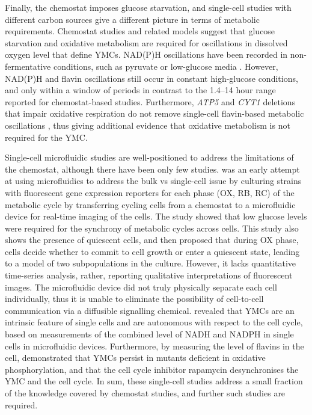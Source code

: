 Finally, the chemostat imposes glucose starvation, and single-cell studies with different carbon sources give a different picture in terms of metabolic requirements.
Chemostat studies and related models suggest that glucose starvation and oxidative metabolism are required for oscillations in dissolved oxygen level that define YMCs.
NAD(P)H oscillations have been recorded in non-fermentative conditions, such as pyruvate or low-glucose media \citep{papagiannakisAutonomousMetabolicOscillations2017}.
However, NAD(P)H \citep{papagiannakisAutonomousMetabolicOscillations2017,ozsezenInferenceHighLevelInteraction2019} and flavin \citep{baumgartnerFlavinbasedMetabolicCycles2018} oscillations still occur in constant high-glucose conditions, and only within a window of periods in contrast to the 1.4--14 hour range reported for chemostat-based studies.
Furthermore, \emph{ATP5} and \emph{CYT1} deletions that impair oxidative respiration do not remove single-cell flavin-based metabolic oscillations \citep{baumgartnerFlavinbasedMetabolicCycles2018}, thus giving additional evidence that oxidative metabolism is not required for the YMC.

Single-cell microfluidic studies are well-positioned to address the limitations of the chemostat,
although there have been only few studies.
\citet{laxmanBehaviorMetabolicCycling2010} was an early attempt at using microfluidics to address the bulk vs single-cell issue by culturing strains with fluorescent gene expression reporters for each phase (OX, RB, RC) of the metabolic cycle by transferring cycling cells from a chemostat to a microfluidic device for real-time imaging of the cells.
The study showed that low glucose levels were required for the synchrony of metabolic cycles across cells.
This study also shows the presence of quiescent cells, and then proposed that during OX phase, cells decide whether to commit to cell growth or enter a quiescent state, leading to a model of two subpopulations in the culture.
However, it lacks quantitative time-series analysis, rather, reporting qualitative interpretations of fluorescent images.
The microfluidic device did not truly physically separate each cell individually, thus it is unable to eliminate the possibility of cell-to-cell communication via a diffusible signalling chemical.
\citet{papagiannakisAutonomousMetabolicOscillations2017} revealed that YMCs are an intrinsic feature of single cells and are autonomous with respect to the cell cycle, based on measurements of the combined level of NADH and NADPH in single cells in microfluidic devices.
Furthermore, by measuring the level of flavins in the cell, \citet{baumgartnerFlavinbasedMetabolicCycles2018} demonstrated that YMCs persist in mutants deficient in oxidative phosphorylation, and that the cell cycle inhibitor rapamycin desynchronises the YMC and the cell cycle.
In sum, these single-cell studies address a small fraction of the knowledge covered by chemostat studies, and further such studies are required.


